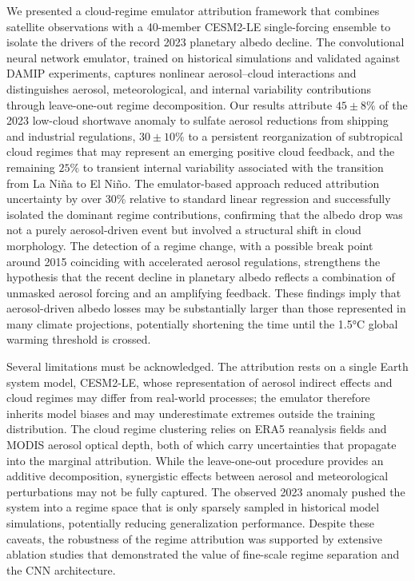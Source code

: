 \documentclass{article}
\begin{document}
We presented a cloud-regime emulator attribution framework that combines satellite observations with a 40-member CESM2-LE single-forcing ensemble to isolate the drivers of the record 2023 planetary albedo decline. The convolutional neural network emulator, trained on historical simulations and validated against DAMIP experiments, captures nonlinear aerosol–cloud interactions and distinguishes aerosol, meteorological, and internal variability contributions through leave-one-out regime decomposition. Our results attribute \(45\pm8\%\) of the 2023 low-cloud shortwave anomaly to sulfate aerosol reductions from shipping and industrial regulations, \(30\pm10\%\) to a persistent reorganization of subtropical cloud regimes that may represent an emerging positive cloud feedback, and the remaining \(25\%\) to transient internal variability associated with the transition from La Niña to El Niño. The emulator-based approach reduced attribution uncertainty by over 30\% relative to standard linear regression and successfully isolated the dominant regime contributions, confirming that the albedo drop was not a purely aerosol-driven event but involved a structural shift in cloud morphology. The detection of a regime change, with a possible break point around 2015 coinciding with accelerated aerosol regulations, strengthens the hypothesis that the recent decline in planetary albedo reflects a combination of unmasked aerosol forcing and an amplifying feedback. These findings imply that aerosol-driven albedo losses may be substantially larger than those represented in many climate projections, potentially shortening the time until the 1.5°C global warming threshold is crossed.

Several limitations must be acknowledged. The attribution rests on a single Earth system model, CESM2-LE, whose representation of aerosol indirect effects and cloud regimes may differ from real-world processes; the emulator therefore inherits model biases and may underestimate extremes outside the training distribution. The cloud regime clustering relies on ERA5 reanalysis fields and MODIS aerosol optical depth, both of which carry uncertainties that propagate into the marginal attribution. While the leave-one-out procedure provides an additive decomposition, synergistic effects between aerosol and meteorological perturbations may not be fully captured. The observed 2023 anomaly pushed the system into a regime space that is only sparsely sampled in historical model simulations, potentially reducing generalization performance. Despite these caveats, the robustness of the regime attribution was supported by extensive ablation studies that demonstrated the value of fine-scale regime separation and the CNN architecture.
\end{document}
